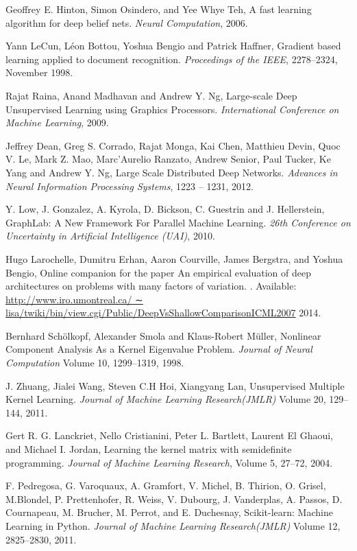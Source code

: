 \documentclass[a4paper, 12pt, oneside]{Thesis}  %
\begin{document}
\begin{thebibliography}{9}
 Geoffrey E. Hinton, Simon Osindero, and Yee Whye Teh, A fast learning algorithm for deep belief nets. \newblock \emph{Neural Computation}, 2006.

 Yann LeCun, L\'{e}on Bottou, Yoshua Bengio and Patrick Haffner, Gradient based learning applied to document recognition. \newblock \emph{Proceedings of the IEEE}, 2278–2324,
November 1998.

 Rajat Raina, Anand Madhavan and Andrew Y. Ng, Large-scale Deep Unsupervised Learning using Graphics Processors. \newblock \emph{International Conference on Machine Learning}, 2009.

 Jeffrey Dean, Greg S. Corrado, Rajat Monga, Kai Chen, Matthieu Devin, Quoc V. Le, Mark Z. Mao, Marc’Aurelio Ranzato, Andrew Senior, Paul Tucker, Ke Yang and Andrew Y. Ng, Large Scale Distributed Deep Networks. \newblock \emph{Advances in Neural Information Processing Systems}, 1223 -- 1231, 2012.

 Y. Low, J. Gonzalez, A. Kyrola, D. Bickson, C. Guestrin and J. Hellerstein, GraphLab: A New Framework For Parallel Machine Learning. \newblock \emph{26th Conference on Uncertainty in Artificial Intelligence (UAI)}, 2010.

Hugo Larochelle, Dumitru Erhan, Aaron Courville, James Bergstra, and Yoshua Bengio, Online companion for the paper An empirical evaluation of deep architectures on problems with many factors of variation. \newblock [Online]. Available: \url{http://www.iro.umontreal.ca/ ∼ lisa/twiki/bin/view.cgi/Public/DeepVsShallowComparisonICML2007} 2014.

 Bernhard Sch\"{o}lkopf, Alexander Smola and Klaus-Robert M\"{u}ller, Nonlinear Component Analysis As a Kernel Eigenvalue Problem. \newblock \emph{Journal of Neural Computation} Volume 10, 1299--1319, 1998.

 J. Zhuang, Jialei Wang, Steven C.H Hoi, Xiangyang Lan, Unsupervised Multiple Kernel Learning. \newblock \emph{Journal of Machine Learning Research(JMLR)} Volume 20, 129--144, 2011.

 Gert R. G. Lanckriet, Nello Cristianini, Peter L. Bartlett, Laurent El Ghaoui, and Michael I. Jordan, Learning the kernel matrix with semidefinite programming. \newblock \emph{Journal of Machine Learning Research}, Volume 5, 27--72, 2004.

 F. Pedregosa, G. Varoquaux, A. Gramfort, V. Michel, B. Thirion, O. Grisel, M.Blondel, P. Prettenhofer, R. Weiss, V. Dubourg, J. Vanderplas, A. Passos, D. Cournapeau, M. Brucher, M. Perrot, and E. Duchesnay, Scikit-learn: Machine Learning in Python. \newblock \emph{Journal of Machine Learning Research(JMLR)} Volume 12, 2825--2830, 2011.


\end{thebibliography}
\end{document}
